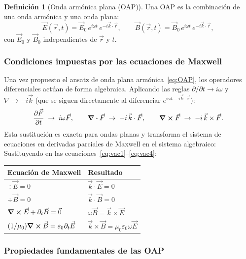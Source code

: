 \documentclass[12pt, a4paper]{article}
\theoremstyle{plain}
\theoremstyle{definition}
\newtheorem{definicion}[teorema]{Definición}
\theoremstyle{remark}
\newcommand{\ve}[1]{\vec{#1}}
\begin{document}
\begin{definicion}[Onda armónica plana (OAP)]
Una OAP es la combinación de una onda armónica y una onda plana:
\begin{equation}
  \ve{E}(\ve{r},t) = \ve{E}_0\,e^{i\omega t}\,e^{-i\ve{k}\cdot\ve{r}},
  \qquad
  \ve{B}(\ve{r},t) = \ve{B}_0\,e^{i\omega t}\,e^{-i\ve{k}\cdot\ve{r}},
  \label{eq:OAP}
\end{equation}
con $\ve{E}_0$ y $\ve{B}_0$ independientes de $\ve{r}$ y $t$.
\end{definicion}

\subsubsection{Condiciones impuestas por las ecuaciones de Maxwell}

Una vez propuesto el ansatz de onda plana armónica~\eqref{eq:OAP}, los
operadores diferenciales actúan de forma algebraica. Aplicando las reglas
$\partial/\partial t \to i\omega$ y $\nabla \to -i\ve{k}$ (que se siguen
directamente al diferenciar $e^{i\omega t - i\ve{k}\cdot\ve{r}}$):
\[
  \pdv{\ve{F}}{t} \;\to\; i\omega\ve{F}, \qquad
  \div\ve{F} \;\to\; -i\,\ve{k}\cdot\ve{F}, \qquad
  \curl\ve{F} \;\to\; -i\,\ve{k}\times\ve{F}.
\]
Esta sustitución es exacta para ondas planas y transforma el sistema de
ecuaciones en derivadas parciales de Maxwell en el sistema algebraico:
Sustituyendo en las ecuaciones~\eqref{eq:vac1}--\eqref{eq:vac4}:

\medskip
\begin{center}
\begin{tabularx}{0.95\linewidth}{@{}L{4.8cm}Y@{}}
  \toprule
  Ecuación de Maxwell & Resultado \\
  \midrule
  $\div\ve{E}=0$                         & $\ve{k}\cdot\ve{E}=0$ \\
  $\div\ve{B}=0$                         & $\ve{k}\cdot\ve{B}=0$ \\
  $\curl\ve{E}+\partial_t\ve{B}=\ve{0}$  & $\omega\ve{B}=\ve{k}\times\ve{E}$ \\
  $(1/\mu_0)\curl\ve{B}=\varepsilon_0\partial_t\ve{E}$ &
  $\ve{k}\times\ve{B}=\mu_0\varepsilon_0\omega\ve{E}$ \\
  \bottomrule
\end{tabularx}
\end{center}

\subsubsection{Propiedades fundamentales de las OAP}
\end{document}
